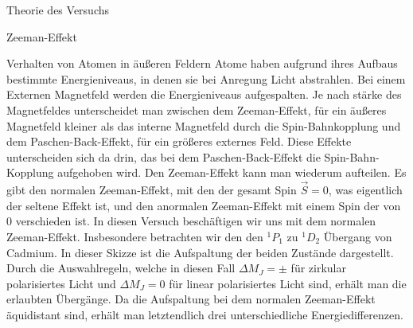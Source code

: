 \documentclass[pdftex, a4paper,11pt, twoside, ngerman]{report}
\begin{document}
  \begin{chapter}{Theorie des Versuchs}
    \label{chp:Theorie}
    
    
    
    \begin{section}{Zeeman-Effekt}
      
      \begin{subsection}{Verhalten von Atomen in äußeren Feldern}
        Atome haben aufgrund ihres Aufbaus bestimmte Energieniveaus,
        in denen sie bei Anregung Licht abstrahlen. 
        Bei einem Externen Magnetfeld werden die Energieniveaus aufgespalten. 
        Je nach stärke des Magnetfeldes unterscheidet man zwischen dem
        Zeeman-Effekt, für ein äußeres Magnetfeld kleiner als das interne
        Magnetfeld durch die Spin-Bahnkopplung und dem Paschen-Back-Effekt,
        für ein größeres externes Feld. Diese Effekte unterscheiden sich da
        drin, das bei dem Paschen-Back-Effekt die Spin-Bahn-Kopplung aufgehoben
        wird. Den Zeeman-Effekt kann man wiederum aufteilen. Es gibt den
        normalen Zeeman-Effekt, mit den der gesamt Spin $\vec S = 0$, was
        eigentlich der seltene Effekt ist, und den anormalen Zeeman-Effekt mit
        einem Spin der von 0 verschieden ist. In diesen Versuch beschäftigen
        wir uns mit dem normalen Zeeman-Effekt. Insbesondere betrachten wir den
        den ${}^1P_1$ zu ${}^1D_2$ Übergang von Cadmium.
        In dieser Skizze ist die Aufspaltung der beiden Zustände dargestellt.
        Durch die Auswahlregeln, welche in diesen Fall $\Delta M_J = \pm$ für
        zirkular polarisiertes Licht und $\Delta M_J=0$ für linear polarisiertes
        Licht sind, erhält man die erlaubten Übergänge. Da die Aufspaltung bei
        dem normalen Zeeman-Effekt äquidistant sind, erhält man letztendlich
        drei unterschiedliche Energiedifferenzen.
        
      \end{subsection}
      

\end{section}
\end{chapter}
\end{document}
